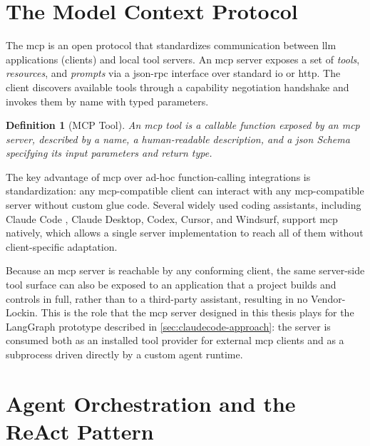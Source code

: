 \documentclass[
  numbers=noenddot,
  english,
  a4paper,
  twoside,
  bibliography=totoc,
  headsepline,
  cleardoublepage=empty,
  parskip=half,
  draft=false
]{scrbook}
\theoremstyle{break}
\newtheorem{definition}{Definition}[chapter]
\renewcommand{\_}{\textunderscore\allowbreak}
\begin{document}
\section{The Model Context Protocol}\label{sec:background:mcp}

The \gls{mcp} \cite{mcp2024spec} is an open protocol that standardizes communication between
\gls{llm} applications (clients) and local tool servers.
An \gls{mcp} server exposes a set of \emph{tools}, \emph{resources}, and \emph{prompts}
via a \gls{json}-\gls{rpc} interface over standard \gls{io} or \gls{http}.
The client discovers available tools through a capability negotiation handshake and invokes
them by name with typed parameters.

\begin{definition}[MCP Tool]
  An \gls{mcp} tool is a callable function exposed by an \gls{mcp} server, described by a
  name, a human-readable description, and a \gls{json} Schema specifying its input parameters
  and return type.
\end{definition}

The key advantage of \gls{mcp} over ad-hoc function-calling integrations is standardization:
any \gls{mcp}-compatible client can interact with any \gls{mcp}-compatible server without
custom glue code.
Several widely used coding assistants, including Claude Code \cite{anthropic2024claudecode},
Claude Desktop, Codex, Cursor, and Windsurf, support \gls{mcp} natively, which allows a single
server implementation to reach all of them without client-specific adaptation.

Because an \gls{mcp} server is reachable by any conforming client, the same server-side tool
surface can also be exposed to an application that a project builds and controls in full, rather
than to a third-party assistant, resulting in no Vendor-Lockin.
This is the role that the \gls{mcp} server designed in this thesis plays for the LangGraph
prototype described in \cref{sec:claudecode-approach}: the server is consumed both as an
installed tool provider for external \gls{mcp} clients and as a subprocess driven directly by a
custom agent runtime.


\section{Agent Orchestration and the ReAct Pattern}\label{sec:background:agents}
\end{document}
